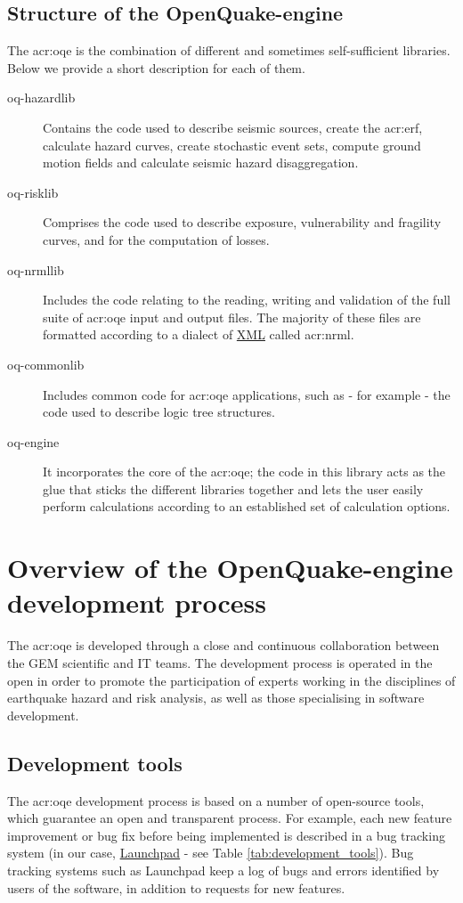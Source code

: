 \subsection{Structure of the OpenQuake-engine}
The \gls{acr:oqe} is the combination of different and sometimes 
self-sufficient libraries. Below we provide a short description for each of
them.
\begin{description}
    \item [oq-hazardlib] Contains the code used to describe 
        seismic sources, create the \gls{acr:erf}, calculate hazard curves, 
        create stochastic event sets, compute ground motion fields and 
        calculate seismic hazard disaggregation.
    \item [oq-risklib] Comprises the code used to describe exposure, 
        vulnerability and fragility curves, and for the computation of losses.
    \item [oq-nrmllib] Includes the code relating to the reading, writing and validation of the full suite of \gls{acr:oqe} input and output files. The majority of these files 
        are formatted according to a dialect of 
        \href{http://www.w3.org/XML/}{XML} called \gls{acr:nrml}. 
    \item [oq-commonlib] Includes common code for \gls{acr:oqe} applications,
        such as - for example - the code used to describe logic tree structures.
    \item [oq-engine] It incorporates the core of the \gls{acr:oqe}; 
        the code in this library acts as the glue that sticks the 
        different libraries together and lets the user easily perform 
        calculations according to an established set of calculation 
        options.
\end{description}
%
\section{Overview of the OpenQuake-engine development process}
%
The \gls{acr:oqe} is developed through a close and continuous collaboration
between the GEM scientific and IT teams. The development process is operated in
the open in order to promote the participation of experts working in the
disciplines of earthquake hazard and risk analysis, as well as those
specialising in software development.
%
\subsection{Development tools}
%
The \gls{acr:oqe} development process is based on a number of open-source
tools, which guarantee an open and transparent process. 
%
For example, each new feature improvement or bug fix before being implemented is
described in a bug tracking system (in our case,
\href{https://launchpad.net/}{Launchpad} - see Table
\ref{tab:development_tools}). 
%
Bug tracking systems such as Launchpad keep a log of bugs and errors identified
by users of the software, in addition to requests for new features.

